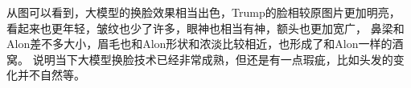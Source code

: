 

从图可以看到，大模型的换脸效果相当出色，Trump的脸相较原图片更加明亮，
看起来也更年轻，皱纹也少了许多，眼神也相当有神，额头也更加宽广，
鼻梁和Alon差不多大小，眉毛也和Alon形状和浓淡比较相近，也形成了和Alon一样的酒窝。
说明当下大模型换脸技术已经非常成熟，但还是有一点瑕疵，比如头发的变化并不自然等。